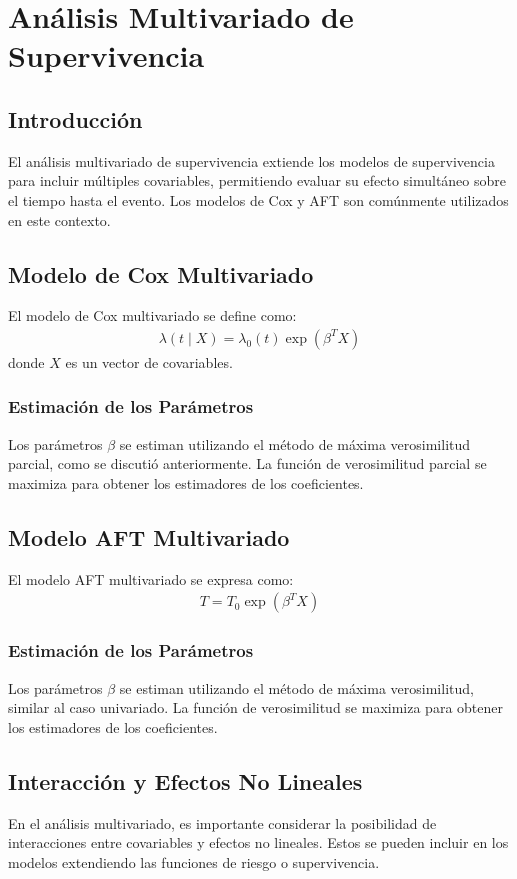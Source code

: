 \documentclass[a4paper]{report} %
\begin{document}
\chapter{Análisis Multivariado de Supervivencia}

\section{Introducci\'on}
El análisis multivariado de supervivencia extiende los modelos de supervivencia para incluir m\'ultiples covariables, permitiendo evaluar su efecto simultáneo sobre el tiempo hasta el evento. Los modelos de Cox y AFT son com\'unmente utilizados en este contexto.

\section{Modelo de Cox Multivariado}
El modelo de Cox multivariado se define como:
\begin{eqnarray*}
\lambda(t \mid X) = \lambda_0(t) \exp(\beta^T X)
\end{eqnarray*}
donde $X$ es un vector de covariables.

\subsection{Estimaci\'on de los Parámetros}
Los parámetros $\beta$ se estiman utilizando el m\'etodo de máxima verosimilitud parcial, como se discuti\'o anteriormente. La funci\'on de verosimilitud parcial se maximiza para obtener los estimadores de los coeficientes.

\section{Modelo AFT Multivariado}
El modelo AFT multivariado se expresa como:
\begin{eqnarray*}
T = T_0 \exp(\beta^T X)
\end{eqnarray*}

\subsection{Estimaci\'on de los Par\'ametros}
Los par\'ametros $\beta$ se estiman utilizando el m\'etodo de m\'axima verosimilitud, similar al caso univariado. La funci\'on de verosimilitud se maximiza para obtener los estimadores de los coeficientes.

\section{Interacci\'on y Efectos No Lineales}
En el an\'alisis multivariado, es importante considerar la posibilidad de interacciones entre covariables y efectos no lineales. Estos se pueden incluir en los modelos extendiendo las funciones de riesgo o supervivencia.
\end{document}
